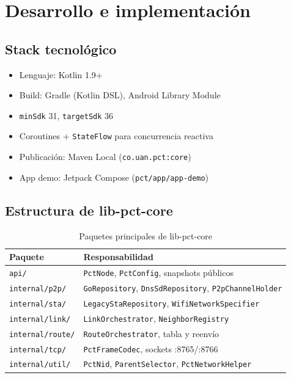 \chapter{Desarrollo e implementación}
\label{cap:desarrollo}

\section{Stack tecnológico}
\label{sec:stack}

\begin{itemize}
  \item Lenguaje: Kotlin 1.9+
  \item Build: Gradle (Kotlin DSL), Android Library Module
  \item \texttt{minSdk} 31, \texttt{targetSdk} 36
  \item Coroutines + \texttt{StateFlow} para concurrencia reactiva
  \item Publicación: Maven Local (\texttt{co.uan.pct:core})
  \item App demo: Jetpack Compose (\texttt{pct/app/app-demo})
\end{itemize}

\section{Estructura de lib-pct-core}
\label{sec:estructura-core}

\begin{table}[htbp]
  \centering
  \caption{Paquetes principales de lib-pct-core}
  \label{tab:paquetes}
  \begin{tabular}{@{}ll@{}}
    \toprule
    \textbf{Paquete} & \textbf{Responsabilidad} \\
    \midrule
    \texttt{api/} & \texttt{PctNode}, \texttt{PctConfig}, snapshots públicos \\
    \texttt{internal/p2p/} & \texttt{GoRepository}, \texttt{DnsSdRepository}, \texttt{P2pChannelHolder} \\
    \texttt{internal/sta/} & \texttt{LegacyStaRepository}, \texttt{WifiNetworkSpecifier} \\
    \texttt{internal/link/} & \texttt{LinkOrchestrator}, \texttt{NeighborRegistry} \\
    \texttt{internal/route/} & \texttt{RouteOrchestrator}, tabla y reenvío \\
    \texttt{internal/tcp/} & \texttt{PctFrameCodec}, sockets :8765/:8766 \\
    \texttt{internal/util/} & \texttt{PctNid}, \texttt{ParentSelector}, \texttt{PctNetworkHelper} \\
    \bottomrule
  \end{tabular}
\end{table}

